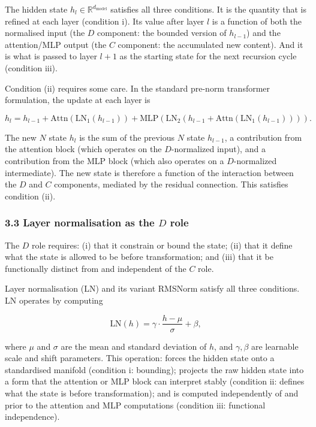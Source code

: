 \documentclass[
  11pt,
  letterpaper,
]{article}
\begin{document}
The hidden state \(h_l \in \mathbb{R}^{d_\text{model}}\) satisfies all
three conditions. It is the quantity that is refined at each layer
(condition i). Its value after layer \(l\) is a function of both the
normalised input (the \(D\) component: the bounded version of
\(h_{l-1}\)) and the attention/MLP output (the \(C\) component: the
accumulated new content). And it is what is passed to layer \(l+1\) as
the starting state for the next recursion cycle (condition iii).

Condition (ii) requires some care. In the standard pre-norm transformer
formulation, the update at each layer is

\[h_l = h_{l-1} + \text{Attn}(\text{LN}_1(h_{l-1})) + \text{MLP}(\text{LN}_2(h_{l-1} + \text{Attn}(\text{LN}_1(h_{l-1})))).\]

The new \(N\) state \(h_l\) is the sum of the previous \(N\) state
\(h_{l-1}\), a contribution from the attention block (which operates on
the \(D\)-normalized input), and a contribution from the MLP block
(which also operates on a \(D\)-normalized intermediate). The new state
is therefore a function of the interaction between the \(D\) and \(C\)
components, mediated by the residual connection. This satisfies
condition (ii).

\subsubsection{\texorpdfstring{3.3 Layer normalisation as the \(D\)
role}{3.3 Layer normalisation as the D role}}\label{layer-normalisation-as-the-d-role}

The \(D\) role requires: (i) that it constrain or bound the state; (ii)
that it define what the state is allowed to be before transformation;
and (iii) that it be functionally distinct from and independent of the
\(C\) role.

Layer normalisation (LN) and its variant RMSNorm satisfy all three
conditions. LN operates by computing

\[\text{LN}(h) = \gamma \cdot \frac{h - \mu}{\sigma} + \beta,\]

where \(\mu\) and \(\sigma\) are the mean and standard deviation of
\(h\), and \(\gamma, \beta\) are learnable scale and shift parameters.
This operation: forces the hidden state onto a standardised manifold
(condition i: bounding); projects the raw hidden state into a form that
the attention or MLP block can interpret stably (condition ii: defines
what the state is before transformation); and is computed independently
of and prior to the attention and MLP computations (condition iii:
functional independence).
\end{document}
